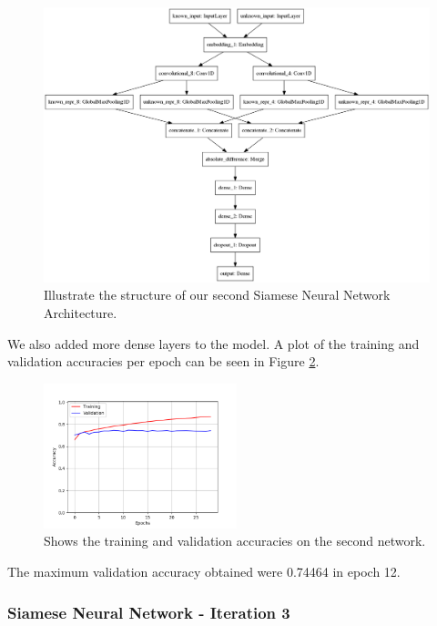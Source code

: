 \begin{figure}
    \centering
    \includegraphics[width=\textwidth]{./pictures/experiments/network2.png}
    \caption{Illustrate the structure of our second Siamese Neural Network
        Architecture.}
    \label{fig:network_2}
\end{figure}

We also added more dense layers to the model. A plot of the
training and validation accuracies per epoch can be seen in Figure
\ref{fig:network2_accuracies}.

\begin{figure}
    \centering
    \includegraphics[width=0.5\textwidth]{./pictures/experiments/network_2_accuracies.png}
    \caption{Shows the training and validation accuracies on the second
        network.}
    \label{fig:network2_accuracies}
\end{figure}

The maximum validation accuracy obtained were 0.74464 in epoch 12.


\subsubsection{Siamese Neural Network - Iteration 3}

